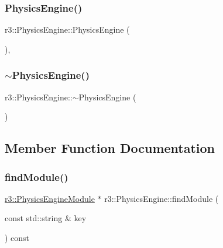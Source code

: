 \subsubsection{\texorpdfstring{Physics\+Engine()}{PhysicsEngine()}}
{\footnotesize\ttfamily r3\+::\+Physics\+Engine\+::\+Physics\+Engine (\begin{DoxyParamCaption}{ }\end{DoxyParamCaption})\hspace{0.3cm}{\ttfamily [explicit]}, {\ttfamily [default]}}

\mbox{\label{classr3_1_1_physics_engine_a37558d625c57485a92a8fc46697fd11c}} 
\subsubsection{\texorpdfstring{$\sim$\+Physics\+Engine()}{~PhysicsEngine()}}
{\footnotesize\ttfamily r3\+::\+Physics\+Engine\+::$\sim$\+Physics\+Engine (\begin{DoxyParamCaption}{ }\end{DoxyParamCaption})\hspace{0.3cm}{\ttfamily [default]}}



\subsection{Member Function Documentation}
\mbox{\label{classr3_1_1_physics_engine_a60779849b362a1b1b43ef2898c90a3ac}} 
\subsubsection{\texorpdfstring{find\+Module()}{findModule()}}
{\footnotesize\ttfamily \mbox{\hyperlink{classr3_1_1_physics_engine_module}{r3\+::\+Physics\+Engine\+Module}} $\ast$ r3\+::\+Physics\+Engine\+::find\+Module (\begin{DoxyParamCaption}\item[{const std\+::string \&}]{key }\end{DoxyParamCaption}) const}

